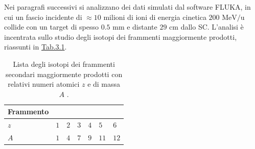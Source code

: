 \documentclass[12pt,a4paper,twoside]{report}
\begin{document}
	Nei paragrafi successivi si analizzano dei dati simulati dal software FLUKA, in cui un fascio incidente di $\approx10$ milioni di ioni  di energia cinetica $200\mbox{ MeV/u}$ collide con un target di  spesso $0.5 \mbox{ mm}$ e distante $29 \mbox{ cm}$ dallo SC. L'analisi è incentrata sullo studio degli isotopi dei frammenti maggiormente prodotti, riassunti in \hyperref[tab:fragments]{Tab.3.1}.
	\begin{table}[H]
		\begin{minipage}{\textwidth}
			\centering
			\begin{tabular}{ |M{2.0cm}||M{1.5cm}|M{1.5cm}|M{1.5cm}|M{1.5cm}|M{1.5cm}|M{1.5cm}| }
				\hline
				Frammento &&&&&&\\
				\hline
				$z$ & $1$& $2$& $3$& $4$& $5$& $6$\\
				\hline
				$A$ & $1$& $4$ &$7$ &$9$& $11$& $12$\\
				\hline
			\end{tabular}
		\end{minipage}
		\caption{Lista degli isotopi dei frammenti secondari maggiormente prodotti con relativi numeri atomici $z$ e di massa $A$ \cite{foot_cdr}.}
		\label{tab:fragments}
	\end{table}
	
\end{document}
